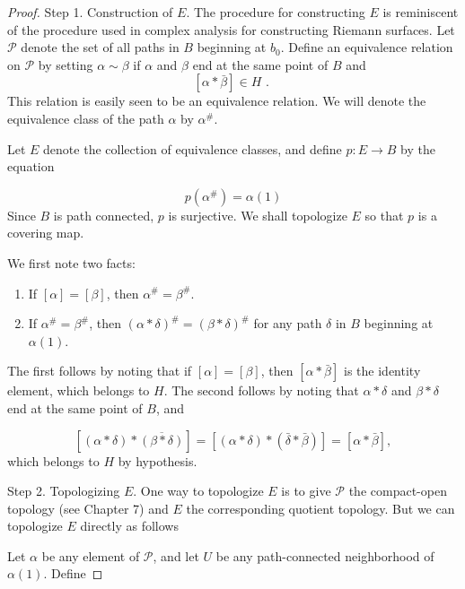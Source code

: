 \begin{proof}
	Step 1. Construction of \(E\). The procedure for constructing \(E\) is reminiscent of the procedure used in complex analysis for constructing Riemann surfaces. Let \(\mathcal{P}\) denote the set of all paths in \(B\) beginning at \(b_{0}\). Define an equivalence relation on \(\mathcal{P}\) by setting \(\alpha \sim \beta\) if \(\alpha\) and \(\beta\) end at the same point of \(B\) and
\[
[ {\alpha * \bar{\beta }}] \in H\text{ . }
\]
This relation is easily seen to be an equivalence relation. We will denote the equivalence class of the path \(\alpha\) by \({\alpha }^{\# }\).

Let \(E\) denote the collection of equivalence classes, and define \(p : E \rightarrow B\) by the equation

\[
p( {\alpha }^{\# }) = \alpha (1)
\]
Since \(B\) is path connected, \(p\) is surjective. We shall topologize \(E\) so that \(p\) is a covering map.

We first note two facts:

\begin{enumerate}[itemsep=0.2em, parsep=0pt, topsep=0pt, partopsep=0pt, leftmargin=*, label=(\arabic*), align=left]
\item If \([ \alpha ] = [ \beta ]\), then \({\alpha }^{\# } = {\beta }^{\# }\).
\item If \({\alpha }^{\# } = {\beta }^{\# }\), then \({( \alpha * \delta ) }^{\# } = {( \beta * \delta ) }^{\# }\) for any path \(\delta\) in \(B\) beginning at \(\alpha (1)\).
\end{enumerate}

The first follows by noting that if \([ \alpha ] = [ \beta ]\), then \([ {\alpha * \bar{\beta }}]\) is the identity element, which belongs to \(H\). The second follows by noting that \(\alpha * \delta\) and \(\beta * \delta\) end at the same point of \(B\), and

\[
[ {( {\alpha * \delta }) * \overline{( \beta * \delta ) }}] = [ {( {\alpha * \delta }) * ( {\bar{\delta } * \bar{\beta }}) }] = [ {\alpha * \bar{\beta }}] ,
\]
which belongs to \(H\) by hypothesis.

Step 2. Topologizing \(E\). One way to topologize \(E\) is to give \(\mathcal{P}\) the compact-open topology (see Chapter 7) and \(E\) the corresponding quotient topology. But we can topologize \(E\) directly as follows

Let \(\alpha\) be any element of \(\mathcal{P}\), and let \(U\) be any path-connected neighborhood of \(\alpha (1)\). Define


\end{proof}
